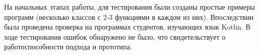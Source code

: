 \documentclass[conference]{IEEEtran}
\begin{document}

На начальных этапах работы, для тестирования были созданы простые примеры 
программ (несколько классов с 2-3 функциями в каждом из них).
Впоследствии была проведена проверка на программах студентов, изучающих язык
Kotlin.
В ходе тестирования ошибок обнаружено не было, что свидетельствует о
работоспособности подхода и прототипа.



\end{document}
